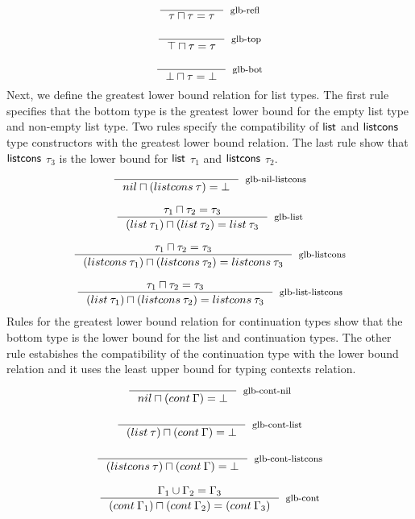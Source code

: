 \documentclass[review]{elsarticle}
\theoremstyle{definition}
\newcommand{\Con}[1]{\red{\mathsf{#1}}}
\begin{document}
\[
\begin{array}{c}
  \inference{}{\tau \sqcap \tau = \tau}[glb-refl] \\ \\
  \inference{}{\top \sqcap \tau = \tau}[glb-top] \\ \\
  \inference{}{\bot \sqcap \tau = \bot}[glb-bot]
\end{array}
\]
Next, we define the greatest lower bound relation for list types. The first rule specifies that the bottom
type is the greatest lower bound for the empty list type and non-empty list type. Two rules specify the
compatibility of \ensuremath{\Con{list}} and \ensuremath{\Con{listcons}} type constructors with the greatest lower bound relation. The last
rule show that \ensuremath{\Con{listcons}} $\tau_3$ is the lower bound for \ensuremath{\Con{list}} $\tau_1$ and \ensuremath{\Con{listcons}} $\tau_2$.
\[
\begin{array}{c}
  \inference{}{nil \sqcap (listcons\: \tau) = \bot}[glb-nil-listcons] \\ \\
  \inference{\tau_1\sqcap \tau_2 = \tau_3}
            {(list\: \tau_1)\sqcap (list\:\tau_2) = list\:\tau_3}
            [glb-list]\\ \\
   \inference{\tau_1\sqcap \tau_2 = \tau_3}
             {(listcons\: \tau_1)\sqcap (listcons\:\tau_2) = listcons\:\tau_3}
             [glb-listcons] \\ \\

   \inference{\tau_1\sqcap \tau_2 = \tau_3}
             {(list\: \tau_1)\sqcap (listcons\:\tau_2) = listcons\:\tau_3}
             [glb-list-listcons]
\end{array}
\]
Rules for the greatest lower bound relation for continuation types show that the bottom type is the
lower bound for the list and continuation types. The other rule estabishes the compatibility of
the continuation type with the lower bound relation and it uses the least upper bound for typing
contexts relation.
\[
\begin{array}{c}
  \inference{}{nil\sqcap(cont\:\Gamma) = \bot}[glb-cont-nil] \\ \\
  \inference{}{(list\:\tau)\sqcap(cont\:\Gamma) = \bot}[glb-cont-list] \\ \\
  \inference{}{(listcons\:\tau)\sqcap(cont\:\Gamma) = \bot}[glb-cont-listcons] \\ \\
  \inference{\Gamma_1\cup\Gamma_2 = \Gamma_3}
            {(cont\:\Gamma_1)\sqcap(cont\:\Gamma_2) = (cont\:\Gamma_3)}
            [glb-cont]
\end{array}
\]
\end{document}

